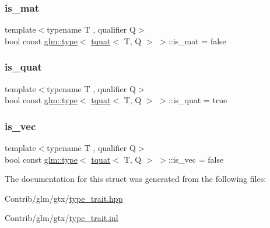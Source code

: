 \mbox{\label{structglm_1_1type_3_01tquat_3_01_t_00_01_q_01_4_01_4_ae80840fbe701f0ada0f430b4e1dae9f1}} 
\subsubsection{\texorpdfstring{is\+\_\+mat}{is\_mat}}
{\footnotesize\ttfamily template$<$typename T , qualifier Q$>$ \\
bool const \mbox{\hyperlink{structglm_1_1type}{glm\+::type}}$<$ \mbox{\hyperlink{structglm_1_1tquat}{tquat}}$<$ T, Q $>$ $>$\+::is\+\_\+mat = false\hspace{0.3cm}{\ttfamily [static]}}

\mbox{\label{structglm_1_1type_3_01tquat_3_01_t_00_01_q_01_4_01_4_ad8a07885504f8eb9d56e1cfbdbc10a68}} 
\subsubsection{\texorpdfstring{is\+\_\+quat}{is\_quat}}
{\footnotesize\ttfamily template$<$typename T , qualifier Q$>$ \\
bool const \mbox{\hyperlink{structglm_1_1type}{glm\+::type}}$<$ \mbox{\hyperlink{structglm_1_1tquat}{tquat}}$<$ T, Q $>$ $>$\+::is\+\_\+quat = true\hspace{0.3cm}{\ttfamily [static]}}

\mbox{\label{structglm_1_1type_3_01tquat_3_01_t_00_01_q_01_4_01_4_a512e63470e03e15c743282a72c0798f3}} 
\subsubsection{\texorpdfstring{is\+\_\+vec}{is\_vec}}
{\footnotesize\ttfamily template$<$typename T , qualifier Q$>$ \\
bool const \mbox{\hyperlink{structglm_1_1type}{glm\+::type}}$<$ \mbox{\hyperlink{structglm_1_1tquat}{tquat}}$<$ T, Q $>$ $>$\+::is\+\_\+vec = false\hspace{0.3cm}{\ttfamily [static]}}



The documentation for this struct was generated from the following files\+:\begin{DoxyCompactItemize}
\item 
Contrib/glm/gtx/\mbox{\hyperlink{type__trait_8hpp}{type\+\_\+trait.\+hpp}}\item 
Contrib/glm/gtx/\mbox{\hyperlink{type__trait_8inl}{type\+\_\+trait.\+inl}}\end{DoxyCompactItemize}
